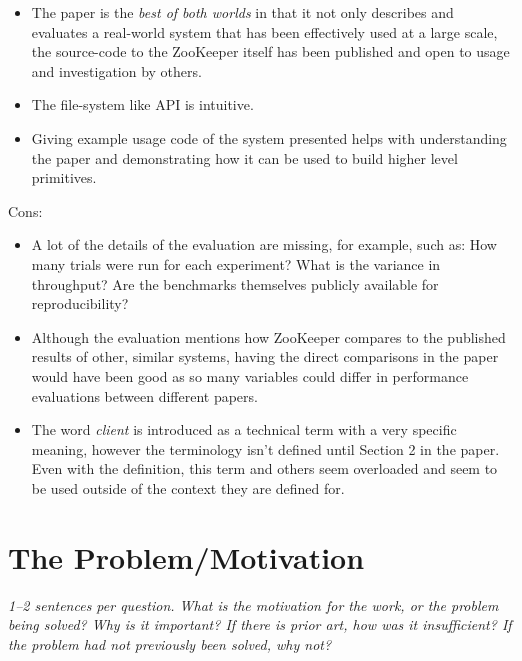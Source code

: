\documentclass[11pt]{article}
\begin{document}
\begin{itemize}

    \item The paper is the \textit{best of both worlds} in that it not only
    describes and evaluates a real-world system that has been effectively used
    at a large scale, the source-code to the ZooKeeper itself has been
    published and open to usage and investigation by others.

    \item The file-system like API is intuitive.

    \item Giving example usage code of the system presented helps with
    understanding the paper and demonstrating how it can be used to build
    higher level primitives.

\end{itemize}

Cons:

\begin{itemize}

    \item A lot of the details of the evaluation are missing, for example, such
    as: How many trials were run for each experiment? What is the variance in
    throughput? Are the benchmarks themselves publicly available for
    reproducibility?

    \item Although the evaluation mentions how ZooKeeper compares to the
    published results of other, similar systems, having the direct comparisons
    in the paper would have been good as so many variables could differ in
    performance evaluations between different papers.

    \item The word \textit{client} is introduced as a technical term with a
    very specific meaning, however the terminology isn't defined until Section
    2 in the paper. Even with the definition, this term and others seem
    overloaded and seem to be used outside of the context they are defined for.

\end{itemize}

\section*{The Problem/Motivation}

\textsl{1--2 sentences per question. What is the motivation for the work, or
the problem being solved? Why is it important? If there is prior art, how was
it insufficient? If the problem had not previously been solved, why not?}
\end{document}
